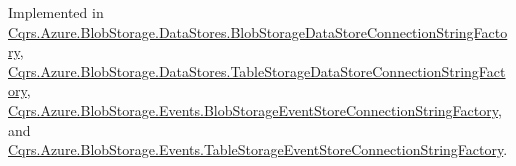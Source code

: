 Implemented in \hyperlink{classCqrs_1_1Azure_1_1BlobStorage_1_1DataStores_1_1BlobStorageDataStoreConnectionStringFactory_a71b549351646fd4261b3f52f264759f4}{Cqrs.\+Azure.\+Blob\+Storage.\+Data\+Stores.\+Blob\+Storage\+Data\+Store\+Connection\+String\+Factory}, \hyperlink{classCqrs_1_1Azure_1_1BlobStorage_1_1DataStores_1_1TableStorageDataStoreConnectionStringFactory_a65b6f404ac2434c6366af73a22e914d1}{Cqrs.\+Azure.\+Blob\+Storage.\+Data\+Stores.\+Table\+Storage\+Data\+Store\+Connection\+String\+Factory}, \hyperlink{classCqrs_1_1Azure_1_1BlobStorage_1_1Events_1_1BlobStorageEventStoreConnectionStringFactory_a002b45d6a893b1b3024b0e7c97f1c9ac}{Cqrs.\+Azure.\+Blob\+Storage.\+Events.\+Blob\+Storage\+Event\+Store\+Connection\+String\+Factory}, and \hyperlink{classCqrs_1_1Azure_1_1BlobStorage_1_1Events_1_1TableStorageEventStoreConnectionStringFactory_a07406c2607bdd42dd13116b92fc6b665}{Cqrs.\+Azure.\+Blob\+Storage.\+Events.\+Table\+Storage\+Event\+Store\+Connection\+String\+Factory}.

